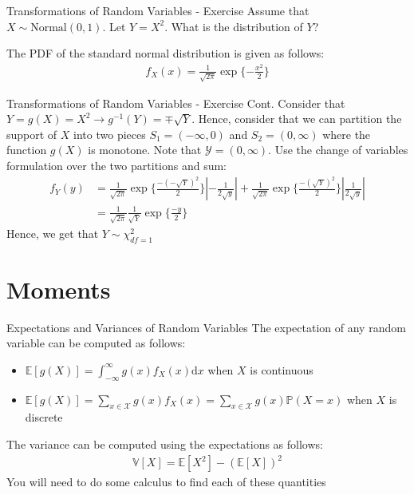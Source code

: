 \documentclass{beamer}
\begin{document}
\begin{frame}{Transformations of Random Variables - Exercise}
Assume that $X\sim \mathrm{Normal}(0,1)$. Let $Y = X^{2}$. What is the distribution of $Y$?
\newline

The PDF of the standard normal distribution is given as follows:
\begin{align*}
f_{X}(x) = \frac{1}{\sqrt{2\pi}} \exp\{-\frac{x^{2}}{2}\}
\end{align*}
\end{frame}

\begin{frame}{Transformations of Random Variables - Exercise Cont.}
Consider that $Y = g(X) = X^{2} \rightarrow g^{-1}(Y) = \mp \sqrt{Y}$. Hence, consider that we can partition the support of $X$ into two pieces $S_{1} = (-\infty, 0)$ and $S_{2} = (0, \infty)$ where the function $g(X)$ is monotone. Note that $\mathcal{Y} = (0, \infty)$. Use the change of variables formulation over the two partitions and sum:
\begin{align*}
f_{Y}(y) &= \frac{1}{\sqrt{2\pi}}\exp\{\frac{-(-\sqrt{Y})^{2}}{2}\}|-\frac{1}{2\sqrt{y}}| + \frac{1}{\sqrt{2\pi}}\exp\{\frac{-(\sqrt{Y})^{2}}{2}\}|\frac{1}{2\sqrt{y}}| \\
&= \frac{1}{\sqrt{2\pi}}\frac{1}{\sqrt{Y}}\exp\{\frac{-y}{2}\}
\end{align*}
Hence, we get that $Y \sim \chi^{2}_{df = 1}$
\end{frame}

\section{Moments}

\begin{frame}{Expectations and Variances of Random Variables}
The expectation of any random variable can be computed as follows:
\begin{itemize}
\item{$\mathbb{E}[g(X)] = \int_{-\infty}^{\infty}g(x)f_{X}(x) \mathrm{d}x$ when $X$ is continuous}
\item{$\mathbb{E}[g(X)] = \sum_{x\in\mathcal{X}}g(x)f_{X}(x) = \sum_{x\in\mathcal{X}}g(x)\mathbb{P}(X = x)$ when $X$ is discrete}
\end{itemize}
The variance can be computed using the expectations as follows:
\begin{align*}
\mathbb{V}[X]  = \mathbb{E}[X^{2}] - (\mathbb{E}[X])^{2}
\end{align*}
You will need to do some calculus to find each of these quantities
\end{frame}
\end{document}
